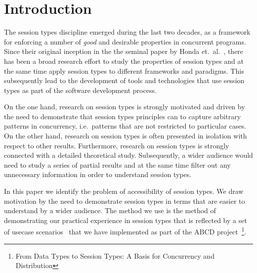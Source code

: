 \section{Introduction}





The session types discipline emerged during the last two decades,
as a framework for enforcing a number of {\em good} and desirable properties
in concurrent programs.
Since their original inception in the
the seminal paper by Honda et.~al.~\cite{Honda.Vasconcelos.Kubo},
there has been a broad research effort to study the properties of
session types and at the same time apply session types to different
frameworks and paradigms. This subsequently lead to the development
of tools and technologies that use session types as part of the 
software development process.

On the one hand, research on session types is strongly motivated and
driven by the need to demonstrate that session types principles can
to capture arbitrary patterns in concurrency,
i.e.~patterns that are not restricted to particular cases.
On the other hand, research on session types%
is often presented in isolation with respect to other results.
Furthermore, research on session types is strongly connected
with a detailed theoretical study.
Subsequently, a wider audience would need to study a series
of partial results and at the same time filter out any
unnecessary information in order to understand session types.

% 

In this paper we identify the problem of accessibility of session
types. We draw motivation by the need to demonstrate session
types in terms that are easier to understand by a wider audience.
The method we use is the method of demonstrating our practical
experience in session types that is reflected by a set of
usecase scenarios~\cite{online_repository} that we have implemented as part of 
the ABCD project~\cite{abcd_webpage}\footnote{From Data Types to Session Types: A Basis for Concurrency and Distribution}.

